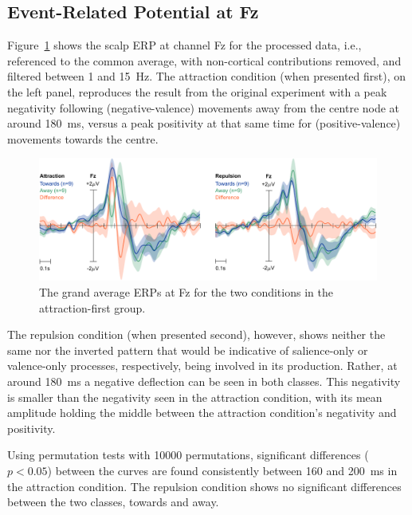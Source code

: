 \subsection{Event-Related Potential at Fz}

Figure~\ref{salval:fig:posfirst-erp-channel} shows the scalp ERP at channel Fz for the processed data, i.e., referenced to the common average, with non-cortical contributions removed, and filtered between 1 and 15~Hz. The attraction condition (when presented first), on the left panel, reproduces the result from the original experiment with a peak negativity following (negative-valence) movements away from the centre node at around 180~ms, versus a peak positivity at that same time for (positive-valence) movements towards the centre. 

\begin{figure}[htb]
    \centering
    \includegraphics[width=\textwidth]{figures/salval-posfirst-erp-channel.pdf}
    \caption[The grand average ERPs at Fz for the two conditions in the attraction-first group.]{The grand average ERPs at Fz for the two conditions in the attraction-first group.}
    \label{salval:fig:posfirst-erp-channel}
\end{figure}

The repulsion condition (when presented second), however, shows neither the same nor the inverted pattern that would be indicative of salience-only or valence-only processes, respectively, being involved in its production. Rather, at around 180~ms a negative deflection can be seen in both classes. This negativity is smaller than the negativity seen in the attraction condition, with its mean amplitude holding the middle between the attraction condition's negativity and positivity.

Using permutation tests with 10000 permutations, significant differences ($p<0.05$) between the curves are found consistently between 160 and 200~ms in the attraction condition. The repulsion condition shows no significant differences between the two classes, towards and away.

